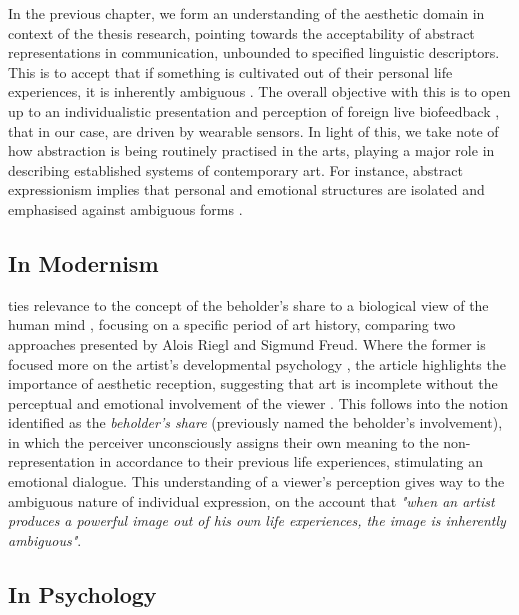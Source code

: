In the previous chapter, we form an understanding of the aesthetic domain in context of the thesis research, pointing towards the acceptability of abstract representations in communication, unbounded to specified linguistic descriptors. This is to accept that if something is cultivated out of their personal life experiences, it is inherently ambiguous \cite{kaplan_esthetic_1948}. The overall objective with this is to open up to an individualistic presentation and perception of foreign live biofeedback \cite{lux_live_2018}, that in our case, are driven by wearable sensors. In light of this, we take note of how abstraction is being routinely practised in the arts, playing a major role in describing established systems of contemporary art. For instance, abstract expressionism implies that personal and emotional structures are isolated and emphasised against ambiguous forms \cite{pollock_action_2008}.

\subsection{In Modernism}

\citeauthor{kandel_two_2013} ties relevance to the concept of the beholder's share to a biological view of the human mind \cite{kandel_two_2013}, focusing on a specific period of art history, comparing two approaches presented by Alois Riegl and Sigmund Freud. Where the former is focused more on the artist's developmental psychology \cite{freud_leonardo_1999}, the article highlights the importance of aesthetic reception, suggesting that art is incomplete without the perceptual and emotional involvement of the viewer \cite{riegl_group_1999}. This follows into the notion identified as the \textit{beholder's share} (previously named the beholder's involvement), in which the perceiver unconsciously assigns their own meaning to the non-representation in accordance to their previous life experiences, stimulating an emotional dialogue. This understanding of a viewer's perception gives way to the ambiguous nature of individual expression, on the account that \textit{"when an artist produces a powerful image out of his own life experiences, the image is inherently ambiguous"}.

\subsection{In Psychology}

